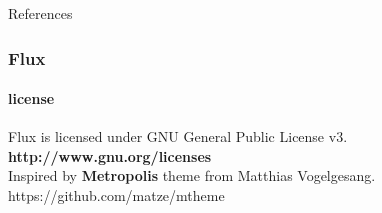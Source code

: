 \documentclass[aspectratio=169,9pt]{beamer}
\begin{document}
\begin{frame}[allowframebreaks]{References}

  \nocite{*}
  
  

\end{frame}

\begin{frame}
 \centering
 \frametitle{Flux}
 \framesubtitle{license}
 Flux is licensed under GNU General Public License v3.\\[0.3cm]
  \centering\textbf{http://www.gnu.org/licenses}\\[0.3cm]
Inspired by \textbf{Metropolis} theme from Matthias Vogelgesang.\\
https://github.com/matze/mtheme 
 
\end{frame}
\end{document}

